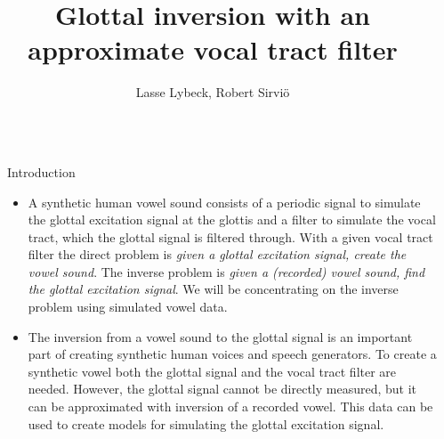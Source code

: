 \documentclass[final]{beamer}
\title{\LARGE Glottal inversion with an approximate vocal tract filter} %
\author{Lasse Lybeck, Robert Sirviö} %
\institute{University of Helsinki, Department of Mathematics and Statistics} %
\begin{document}

\begin{frame}[t] %

\begin{columns}[t] %

\begin{column}{.02\textwidth}\end{column} %

\begin{column}{.465\textwidth} %


            
\begin{block}{Introduction}

\begin{itemize}
\item A synthetic human vowel sound consists of a periodic signal to simulate the glottal excitation signal at the glottis and a filter to simulate the vocal tract, which the glottal signal is filtered through.\cite{touda} With a given vocal tract filter the direct problem is \emph{given a glottal excitation signal, create the vowel sound}. The inverse problem is \emph{given a (recorded) vowel sound, find the glottal excitation signal}. We will be concentrating on the inverse problem using simulated vowel data.

\item The inversion from a vowel sound to the glottal signal is an important part of creating synthetic human voices and speech generators. To create a synthetic vowel both the glottal signal and the vocal tract filter are needed. However, the glottal signal cannot be directly measured, but it can be approximated with inversion of a recorded vowel. This data can be used to create models for simulating the glottal excitation signal.
\end{itemize}

\end{block}


\end{column}
\end{columns}
\end{frame}
\end{document}
